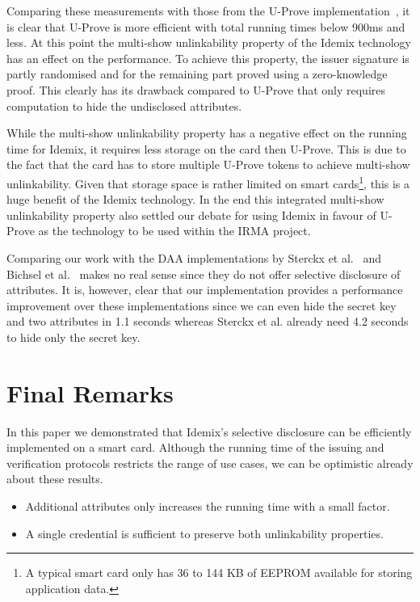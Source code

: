 Comparing these measurements with those from the U-Prove
implementation~\cite{MostowskiVullers11}, it is clear that U-Prove is more
efficient with total running times below 900ms and less. At this point the
multi-show unlinkability property of the Idemix technology has an effect on the
performance. To achieve this property, the issuer signature is partly randomised
and for the remaining part proved using a zero-knowledge proof. This clearly has
its drawback compared to U-Prove that only requires computation to hide the
undisclosed attributes.

While the multi-show unlinkability property has a negative effect on the running
time for Idemix, it requires less storage on the card then U-Prove. This is due
to the fact that the card has to store multiple U-Prove tokens to achieve
multi-show unlinkability. Given that storage space is rather limited on smart
cards\footnote{A typical smart card only has 36 to 144 KB of EEPROM available
for storing application data.}, this is a huge benefit of the Idemix technology.
In the end this integrated multi-show unlinkability property also settled our
debate for using Idemix in favour of U-Prove as the technology to be used within
the IRMA project.

Comparing our work with the DAA implementations by Sterckx et
al.~\cite{Sterckx09} and Bichsel et al.~\cite{BichselCGS2009} makes no real
sense since they do not offer selective disclosure of attributes. It is,
however, clear that our implementation provides a performance improvement over
these implementations since we can even hide the secret key and two attributes
in 1.1 seconds whereas Sterckx et al. already need 4.2 seconds to hide only the
secret key.


\section{Final Remarks}

In this paper we demonstrated that Idemix's selective disclosure can be
efficiently implemented on a smart card. Although the running time of the
issuing and verification protocols restricts the range of use cases, we can be
optimistic already about these results.
\begin{itemize}
  \item Additional attributes only increases the running time with a small
    factor.
  \item A single credential is sufficient to preserve both unlinkability
    properties.
\end{itemize}

